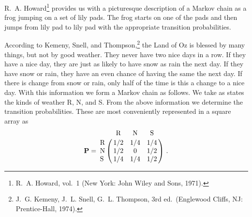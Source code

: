 R.~A. Howard\footnote{R.~A. Howard, 
vol.~1
(New York: John Wiley and Sons, 1971).} provides us with a
picturesque
description of a Markov chain as a frog jumping on a set of lily pads. 
The frog starts on one of the pads and then jumps from lily pad to lily
pad with the appropriate transition probabilities.



\begin{example}\label{exam 11.1.1}
According to Kemeny, Snell, and Thompson,\footnote{J.~G. Kemeny, J.~L. Snell,
G.~L. Thompson,  3rd ed.\ (Englewood
Cliffs, NJ: Prentice-Hall, 1974).} the Land of Oz is blessed by many
things, but
not by good weather.  They never have two nice days in a row.  If they have a
nice day,
they are just as likely to have snow as rain the next day.  If they have snow
or rain, they
have an even chance of having the same the next day.  If there is change from
snow or
rain, only half of the time is this a change to a nice day.  With this
information we form a
Markov chain as follows.  We take as states the kinds of weather R, N, and S. 
From the above information we determine the transition probabilities.  These are most
conveniently represented
in a square array as
$$
\mat {P} = \bordermatrix{
        & \mbox {R} & \mbox {N} & \mbox {S} \cr
\mbox {R} &     1/2 &     1/4 &     1/4 \cr
\mbox {N} &     1/2 &       0 &     1/2 \cr
\mbox {S} &     1/4 &     1/4 &     1/2}\ .
$$
\end{example}

